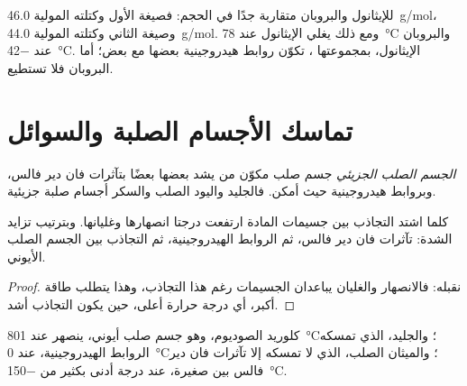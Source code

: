 \begin{example}\label{ex:g11:polarity-and-cohesion:ethanol}
للإيثانول والبروبان  متقاربة جدًا في الحجم: فصيغة الأول 
وكتلته المولية \qty{46.0}{g/mol}، وصيغة الثاني  وكتلته المولية \qty{44.0}{g/mol}. ومع ذلك يغلي
الإيثانول عند \qty{78}{\celsius} والبروبان عند
\qty{-42}{\celsius}.  الإيثانول، بمجموعتها ، تكوّن روابط
هيدروجينية بعضها مع بعض؛ أما  البروبان فلا تستطيع.
\end{example}

\section{تماسك الأجسام الصلبة والسوائل}

\begin{definition}\label{def:g11:polarity-and-cohesion:molecular-solid}
\emph{الجسم الصلب الجزيئي} جسم صلب مكوّن من  يشد
بعضها بعضًا بتآثرات فان دير فالس، وبروابط هيدروجينية حيث أمكن. فالجليد واليود
الصلب والسكر أجسام صلبة جزيئية.
\end{definition}

\begin{proposition}\label{prop:g11:polarity-and-cohesion:cohesion}
كلما اشتد التجاذب بين جسيمات المادة ارتفعت درجتا انصهارها وغليانها. وبترتيب
تزايد الشدة: تآثرات فان دير فالس، ثم الروابط الهيدروجينية، ثم التجاذب بين
 الجسم الصلب الأيوني.
\end{proposition}

\begin{proof}
نقبله: فالانصهار والغليان يباعدان الجسيمات رغم هذا التجاذب، وهذا يتطلب طاقة
أكبر، أي درجة حرارة أعلى، حين يكون التجاذب
أشد.
\end{proof}

\begin{example}\label{ex:g11:polarity-and-cohesion:three}
كلوريد الصوديوم، وهو جسم صلب أيوني، ينصهر عند \qty{801}{\celsius}؛ والجليد،
الذي تمسكه الروابط الهيدروجينية، عند \qty{0}{\celsius}؛ والميثان الصلب، الذي
لا تمسكه إلا تآثرات فان دير فالس بين  صغيرة، عند درجة أدنى بكثير من
\qty{-150}{\celsius}.
\end{example}

